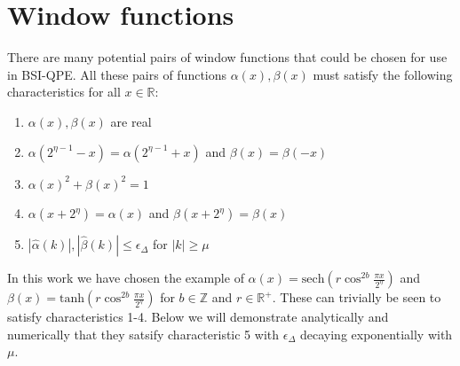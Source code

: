 \documentclass[aps,floatfix,10pt,amssymb,amsfont,amsmath,superscriptaddress,float,nofootinbib,longbibliography,nobalancelastpage,twocolumn]{revtex4-2}
\begin{document}

\appendix
\onecolumngrid    
\section{Window functions}
\label{section:appendix}
There are many potential pairs of window functions that could be chosen for use in BSI-QPE. All these pairs of functions $\alpha(x), \beta(x)$ must satisfy the following characteristics for all $x \in \mathbb{R}$:
\begin{enumerate}
    \item $\alpha(x), \beta(x)$ are real
    \item $\alpha(2^{\eta-1}-x) = \alpha(2^{\eta-1}+x)$ and $\beta(x) = \beta(-x)$
    \item $\alpha(x)^2+\beta(x)^2 =1$
    \item $\alpha(x+2^{\eta}) = \alpha(x)$ and $\beta(x+2^{\eta}) = \beta(x)$
    \item $|\hat \alpha(k)|, |\hat \beta(k)| \leq \epsilon_\Delta$ for $|k| \geq \mu$
\end{enumerate}
In this work we have chosen the example of $\alpha(x) = \text{sech}( r\cos^{2b} \frac{\pi x}{2^{\eta}})$ and $\beta(x) = \text{tanh}(r \cos^{2b} \frac{\pi x}{2^{\eta}})$ for $b \in \mathbb{Z}$ and $r \in \mathbb{R}^+$. These can trivially be seen to satisfy characteristics 1-4. Below we will demonstrate analytically and numerically that they satsify characteristic 5 with $\epsilon_{\Delta}$ decaying exponentially with $\mu$.
\end{document}
